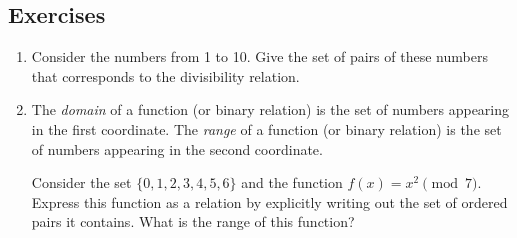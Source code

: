 \documentclass[10pt,]{book}
\theoremstyle{plain}
\theoremstyle{definition}
\theoremstyle{definition}
\numberwithin{equation}{section}
\newcommand{\hint}[1]{ }
\begin{document}
\subsection[{Exercises}]{Exercises}\label{exercises-7}
\leavevmode%
\begin{enumerate}[label=(\alph*)]
\item\hypertarget{li-100}{}
          Consider the numbers from 1 to 10.  Give the set of pairs of these numbers that 
          corresponds to the divisibility relation.



          \hint{A pair is ``in'' the relation when the first number gazinta the second number.  \(1\) gazinta anything, \(2\) gazinta the even numbers, \(3\) gazinta \(3\), \(6\) and \(9\), etc. (Also a number always gazinta itself.)}
\item\hypertarget{li-101}{}
          The \emph{domain} of a function (or binary relation) 
          is the set of numbers appearing in the first coordinate.  The  
          \emph{range} of a function (or binary relation) is the set of numbers 
          appearing in the second coordinate.  

          Consider the set \(\{0,1,2,3,4,5,6\}\) and the function \(f(x) = x^2 \pmod{7}\).
          Express this function as a relation by explicitly writing out the set of
          ordered pairs it contains.  What is the range of this function?
 
 
 

\end{enumerate}
\end{document}
